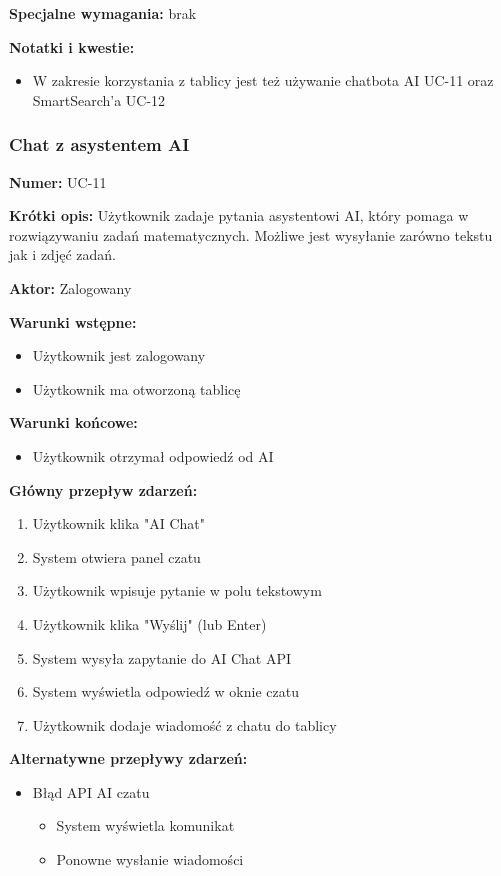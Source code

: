 \documentclass[12pt,a4paper]{article}
\begin{document}
\textbf{Specjalne wymagania:}
brak

\textbf{Notatki i kwestie:} \begin{itemize}
    \item W zakresie korzystania z tablicy jest też używanie chatbota AI UC-11 oraz SmartSearch'a UC-12
\end{itemize}

\subsubsection{Chat z asystentem AI}

\textbf{Numer:} UC-11

\textbf{Krótki opis:} Użytkownik zadaje pytania asystentowi AI, który pomaga w rozwiązywaniu zadań matematycznych. Możliwe jest wysyłanie zarówno tekstu jak i zdjęć zadań.

\textbf{Aktor:} Zalogowany

\textbf{Warunki wstępne:}
\begin{itemize}[leftmargin=*]
    \item Użytkownik jest zalogowany
    \item Użytkownik ma otworzoną tablicę
\end{itemize}

\textbf{Warunki końcowe:}
\begin{itemize}[leftmargin=*]
    \item Użytkownik otrzymał odpowiedź od AI
\end{itemize}

\textbf{Główny przepływ zdarzeń:}
\begin{enumerate}[leftmargin=*]
    \item Użytkownik klika "AI Chat"
    \item System otwiera panel czatu
    \item Użytkownik wpisuje pytanie w polu tekstowym
    \item Użytkownik klika "Wyślij" (lub Enter)
    \item System wysyła zapytanie do AI Chat API
    \item System wyświetla odpowiedź w oknie czatu
    \item Użytkownik dodaje wiadomość z chatu do tablicy
\end{enumerate}

\textbf{Alternatywne przepływy zdarzeń:}
\begin{itemize}[leftmargin=*]
    \item[3a] Błąd API AI czatu
    \begin{itemize}
    \item System wyświetla komunikat
    \item Ponowne wysłanie wiadomości
\end{itemize}
\end{itemize}
\end{document}
